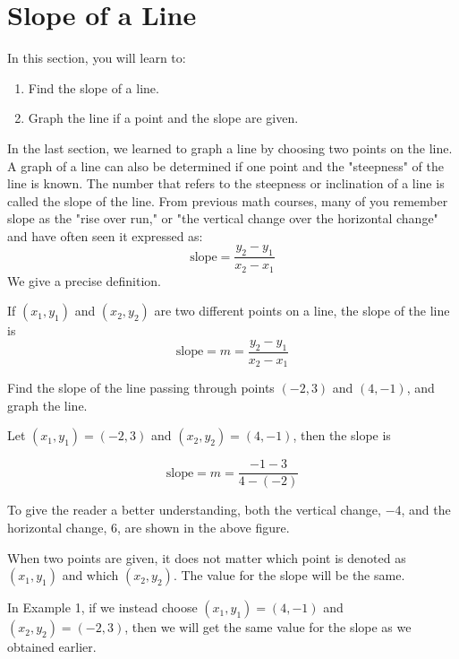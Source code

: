 \section{Slope of a Line}

In this section, you will learn to:
\begin{enumerate}
    \item Find the slope of a line.
    \item Graph the line if a point and the slope are given.
\end{enumerate}

In the last section, we learned to graph a line by choosing two points on the line. A graph of a line can also be determined if one point and the "steepness" of the line is known. The number that refers to the steepness or inclination of a line is called the slope of the line. From previous math courses, many of you remember slope as the "rise over run," or "the vertical change over the horizontal change" and have often seen it expressed as:
\[
\text{slope} = \frac{{y_2 - y_1}}{{x_2 - x_1}}
\]
We give a precise definition.

\begin{definition} If \((x_1, y_1)\) and \((x_2, y_2)\) are two different points on a line, the slope of the line is
\[
\text{slope} = m = \frac{{y_2 - y_1}}{{x_2 - x_1}}
\]
\end{definition}

\begin{example}
Find the slope of the line passing through points \((-2, 3)\) and \((4, -1)\), and graph the line.
\end{example}

\begin{solution} Let \((x_1, y_1) = (-2, 3)\) and \((x_2, y_2) = (4, -1)\), then the slope is

\[
\text{slope} = m = \frac{{-1 - 3}}{{4 - (-2)}}
\]
\end{solution}
To give the reader a better understanding, both the vertical change, \(-4\), and the horizontal change, \(6\), are shown in the above figure.

When two points are given, it does not matter which point is denoted as \((x_1, y_1)\) and which \((x_2, y_2)\). The value for the slope will be the same.

In Example 1, if we instead choose \((x_1, y_1) = (4, -1)\) and \((x_2, y_2) = (-2, 3)\), then we will get the same value for the slope as we obtained earlier.


